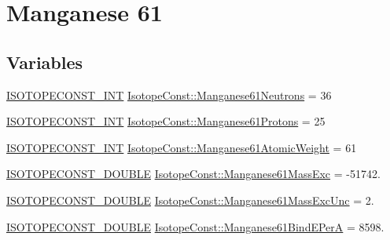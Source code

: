 \hypertarget{group___isotope_const-_manganese-_mn61}{}\section{Manganese 61}
\label{group___isotope_const-_manganese-_mn61}
\subsection*{Variables}
\begin{DoxyCompactItemize}
\item 
\mbox{\hyperlink{group___isotope_const-_macros_ga5f18360b3e99483a35c32d789e62621c}{I\+S\+O\+T\+O\+P\+E\+C\+O\+N\+S\+T\+\_\+\+I\+NT}} \mbox{\hyperlink{group___isotope_const-_manganese-_mn61_ga9910a6de1f92d44636b71664dd8e5269}{Isotope\+Const\+::\+Manganese61\+Neutrons}} = 36
\item 
\mbox{\hyperlink{group___isotope_const-_macros_ga5f18360b3e99483a35c32d789e62621c}{I\+S\+O\+T\+O\+P\+E\+C\+O\+N\+S\+T\+\_\+\+I\+NT}} \mbox{\hyperlink{group___isotope_const-_manganese-_mn61_gae4e436aa88552e28131ede68f1962e8a}{Isotope\+Const\+::\+Manganese61\+Protons}} = 25
\item 
\mbox{\hyperlink{group___isotope_const-_macros_ga5f18360b3e99483a35c32d789e62621c}{I\+S\+O\+T\+O\+P\+E\+C\+O\+N\+S\+T\+\_\+\+I\+NT}} \mbox{\hyperlink{group___isotope_const-_manganese-_mn61_ga28545044664d03abf85470a0938335b6}{Isotope\+Const\+::\+Manganese61\+Atomic\+Weight}} = 61
\item 
\mbox{\hyperlink{group___isotope_const-_macros_ga8f45a7272ce02c0b4c65c44636ed719a}{I\+S\+O\+T\+O\+P\+E\+C\+O\+N\+S\+T\+\_\+\+D\+O\+U\+B\+LE}} \mbox{\hyperlink{group___isotope_const-_manganese-_mn61_ga18bc73e817aa126b47c26385b7513838}{Isotope\+Const\+::\+Manganese61\+Mass\+Exc}} = -\/51742.
\item 
\mbox{\hyperlink{group___isotope_const-_macros_ga8f45a7272ce02c0b4c65c44636ed719a}{I\+S\+O\+T\+O\+P\+E\+C\+O\+N\+S\+T\+\_\+\+D\+O\+U\+B\+LE}} \mbox{\hyperlink{group___isotope_const-_manganese-_mn61_gaf2f3060a2c15d3ab6fa9c02685675ac1}{Isotope\+Const\+::\+Manganese61\+Mass\+Exc\+Unc}} = 2.
\item 
\mbox{\hyperlink{group___isotope_const-_macros_ga8f45a7272ce02c0b4c65c44636ed719a}{I\+S\+O\+T\+O\+P\+E\+C\+O\+N\+S\+T\+\_\+\+D\+O\+U\+B\+LE}} \mbox{\hyperlink{group___isotope_const-_manganese-_mn61_gae81b9c79ea58e9844ab00000b80620a3}{Isotope\+Const\+::\+Manganese61\+Bind\+E\+PerA}} = 8598.
\item 

\end{DoxyCompactItemize}
